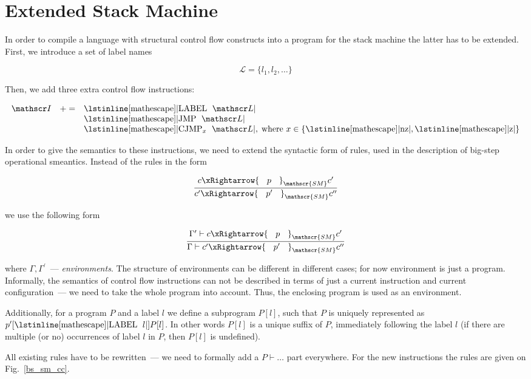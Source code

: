 \documentclass{article}
\author{Dmitry Boulytchev}
\def\transarrow{\xrightarrow}
\newcommand{\setarrow}[1]{\def\transarrow{#1}}
\def\padding{\phantom{X}}
\def\subarrow{}
\newcommand{\setsubarrow}[1]{\def\subarrow{#1}}
\newcommand{\trule}[2]{\frac{#1}{#2}}
\newcommand{\withenv}[2]{{#1}\vdash{#2}}
\newcommand{\trans}[3]{{#1}\transarrow{\padding{\textstyle #2}\padding}\subarrow{#3}}
\newcommand{\llang}[1]{\mbox{\lstinline[mathescape]|#1|}}
\theoremstyle{definition}
\begin{document}
\section{Extended Stack Machine}

In order to compile a language with structural control flow constructs into a program for the stack machine the latter has to be extended. First, we introduce a set of label names

\[
\mathscr L = \{l_1, l_2, \dots\}
\]

Then, we add three extra control flow instructions:

\[
\begin{array}{rcl}
  \mathscr I & += & \llang{LABEL $\;\mathscr L$} \\
             &   & \llang{JMP $\;\mathscr L$} \\
  &   & \llang{CJMP$_x$ $\;\mathscr L$},\;\mbox{where $x\in\{\llang{nz}, \llang{z}\}$}
\end{array}
\]

In order to give the semantics to these instructions, we need to extend the syntactic form of rules, used in the description of big-step operational smeantics. Instead of
the rules in the form

\setarrow{\xRightarrow}
\setsubarrow{_{\mathscr{SM}}}

\[
\trule{\trans{c}{p}{c^\prime}}{\trans{c^\prime}{p^\prime}{c^{\prime\prime}}}
\]

we use the following form

\[
\trule{\withenv{\Gamma^\prime}{\trans{c}{p}{c^\prime}}}{\withenv{\Gamma}{\trans{c^\prime}{p^\prime}{c^{\prime\prime}}}}
\]

where $\Gamma, \Gamma^\prime$~--- \emph{environments}. The structure of environments can be different in different cases; for now environment is just a program. Informally,
the semantics of control flow instructions can not be described in terms of just a current instruction and current configuration~--- we need to take the whole
program into account. Thus, the enclosing program is used as an environment.

Additionally, for a program $P$ and a label $l$ we define a subprogram $P[l]$, such that $P$ is uniquely represented as $p^\prime[\llang{LABEL $\;l$}]P[l]$.
In other words $P[l]$ is a unique suffix of $P$, immediately following the label $l$ (if there are multiple (or no) occurrences of label $l$ in $P$, then $P[l]$ is
undefined).

All existing rules have to be rewritten~--- we need to formally add a $\withenv{P}{\dots}$ part everywhere. For the new instructions the rules are given on Fig.~\ref{bs_sm_cc}.
\end{document}
